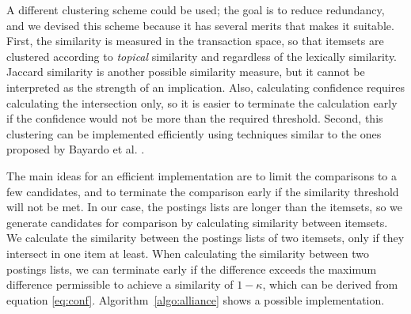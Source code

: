 \documentclass[letterpaper,12pt,titlepage,oneside,final]{book}
\begin{document}
A different clustering scheme could be used;
the goal is to reduce redundancy,
and we devised this scheme because it has 
several merits that makes it suitable.
First, the similarity is measured in the transaction space, 
so that itemsets are clustered according 
to \emph{topical} similarity and regardless of the
lexically similarity.
Jaccard similarity is another possible 
similarity measure, but it 
cannot be interpreted as
the strength of an implication.
Also, calculating confidence requires calculating the intersection only,
so it is easier to terminate the calculation early 
if the confidence would not be more than the required threshold.
Second, this clustering can be implemented efficiently using techniques similar to
the ones proposed by Bayardo et al. \cite{bayardo2007scaling}.

The main ideas for an efficient implementation are 
to limit the comparisons to a few candidates,
and to terminate the comparison early if the similarity threshold will not
be met.
In our case, the postings lists are longer than the itemsets,
so we generate candidates for comparison by calculating similarity between
itemsets. 
We calculate the similarity between the postings lists of two itemsets,
only if they intersect in one item at least.
When calculating the similarity between two postings lists,
we can terminate early if the difference exceeds the maximum difference
permissible to achieve a similarity of $1-\kappa$,
which can be derived from equation \ref{eq:conf}.
Algorithm~\ref{algo:alliance}  shows a possible implementation.
\end{document}
